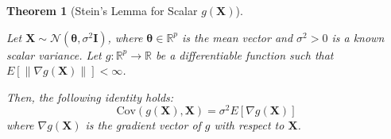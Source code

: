\documentclass[
  letterpaper,
  DIV=11,
  numbers=noendperiod]{scrreprt}
\renewcommand{\[}{\begin{equation}}
\renewcommand{\]}{\end{equation}}
\theoremstyle{definition}
\theoremstyle{plain}
\theoremstyle{plain}
\theoremstyle{plain}
\newtheorem{theorem}{Theorem}[chapter]
\theoremstyle{definition}
\theoremstyle{plain}
\theoremstyle{remark}
\begin{document}
\begin{theorem}[Stein's Lemma for Scalar
\(g(\mathbf{X})\)]\protect\hypertarget{thm-steins-lemma}{}\label{thm-steins-lemma}

Let
\(\mathbf{X} \sim \mathcal{N}(\boldsymbol{\theta}, \sigma^2 \mathbf{I})\),
where \(\boldsymbol{\theta} \in \mathbb{R}^p\) is the mean vector and
\(\sigma^2 > 0\) is a known scalar variance. Let
\(g: \mathbb{R}^p \to \mathbb{R}\) be a differentiable function such
that \(E[\|\nabla g(\mathbf{X})\|] < \infty\).

Then, the following identity holds: \[
\text{Cov}(g(\mathbf{X}), \mathbf{X}) = \sigma^2 E[\nabla g(\mathbf{X})]
\] where \(\nabla g(\mathbf{X})\) is the gradient vector of \(g\) with
respect to \(\mathbf{X}\).

\end{theorem}
\end{document}
